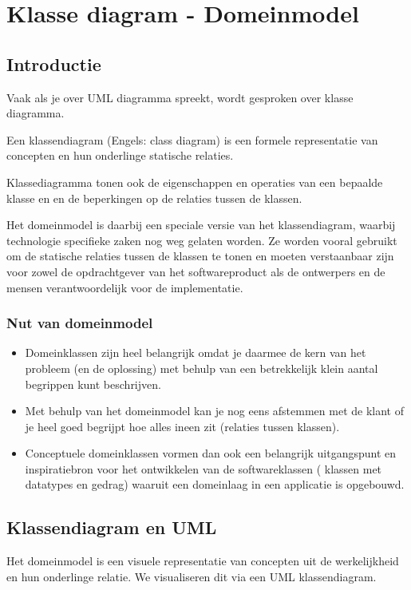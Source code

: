\chapter{Klasse diagram - Domeinmodel}

\section{Introductie}
Vaak als je over UML diagramma spreekt, wordt gesproken over klasse diagramma. 

\begin{definition}
Een klassendiagram (Engels: class diagram) is een formele representatie van concepten en hun onderlinge statische relaties.
\end{definition}

Klassediagramma tonen ook de eigenschappen en operaties van een bepaalde klasse en 
en de beperkingen op de relaties tussen de klassen. 

Het domeinmodel is daarbij een speciale versie van het klassendiagram,
waarbij technologie specifieke zaken nog weg gelaten worden. Ze worden vooral
gebruikt om de statische relaties tussen de klassen te tonen en moeten 
verstaanbaar zijn voor zowel de opdrachtgever van het softwareproduct
als de ontwerpers en de mensen verantwoordelijk voor de implementatie. 

\subsection{Nut van domeinmodel}

\begin{itemize}
\item Domeinklassen zijn heel belangrijk omdat je daarmee de kern van het probleem (en de oplossing) met behulp van een betrekkelijk klein aantal begrippen kunt beschrijven.

\item Met behulp van het domeinmodel kan je nog eens afstemmen met de klant of je heel goed begrijpt hoe alles ineen zit (relaties tussen klassen).

\item Conceptuele domeinklassen vormen dan ook een belangrijk uitgangspunt en inspiratiebron voor het ontwikkelen van de softwareklassen ( klassen met datatypes en gedrag) waaruit een domeinlaag in een applicatie is opgebouwd.
\end{itemize}

\section{Klassendiagram en UML}
Het domeinmodel is een  visuele representatie van concepten uit de werkelijkheid en hun onderlinge relatie. We visualiseren dit via een UML klassendiagram. 

